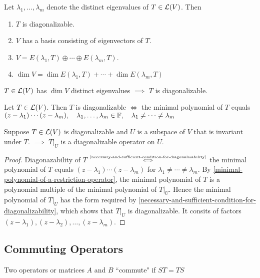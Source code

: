 \setcounter{thm}{45}
\begin{thm}
    \label{conditions-equivalent-to-diagonalizability}
    Let $\lambda_1, \dots,\lambda_m$ denote the distinct eigenvalues of $T\in \mathcal{L} (V)$. Then
    \begin{enumerate}[label=(\alph*)]
        \item $T$ is diagonalizable.
        \item $V$ has a basis consisting of eigenvectors of $T$.
        \item $V=E(\lambda_1, T) \oplus \cdots \oplus E(\lambda_m, T).$
        \item $\dim V = \dim E(\lambda_1, T) + \cdots + \dim E(\lambda_m, T)$
    \end{enumerate}
\end{thm}

\setcounter{thm}{57}
\begin{thm}
    \label{enough-eigenvalues-implies-diagonalizability}
    $T\in \mathcal{L}(V)$ has $\dim V$ distinct eigenvalues $\implies$ $T$ is diagonalizable. 
\end{thm}

\pagebreak

\setcounter{thm}{61}
\begin{thm}
    \label{necessary-and-sufficient-condition-for-diagonalizability}
    Let $T\in \mathcal{L} (V)$. Then $T$ is diagonalizable $\iff$ the minimal polynomial of $T$ equals $(z-\lambda_1) \cdots (z-\lambda_m), \quad \lambda_1, \dots, \lambda_m \in \mathbb{F}, \quad \lambda_1 \neq \cdots \neq \lambda_m$
\end{thm}

\setcounter{thm}{64}
\begin{thm}
    \label{restriction-ofdiagonalizable-operator-to-invariant-subspace}
    Suppose $T\in \mathcal{L}(V)$ is diagonalizable and $U$ is a subspace of $V$ that is invariant under $T$. $\implies$ $\left.T\right|_U$ is a diagonalizable operator on $U$. 
\end{thm}
\begin{proof}
    Diagonazability of $T$ $\mathsmaller{\overset{\text{\ref{necessary-and-sufficient-condition-for-diagonalizability}}}{\iff}}$ the minimal polynomial of $T$ equals $(z-\lambda_1)\cdots(z-\lambda_m)$ for $\lambda_1 \neq \cdots \neq \lambda_m$. By \ref{minimal-polynomial-of-a-restriction-operator}, the minimal polynomial of $T$ is a polynomial multiple of the minimal polynomial of $\left.T\right|_U$. Hence the minimal polynomial of $\left.T\right|_U$  has the form required by \ref{necessary-and-sufficient-condition-for-diagonalizability}, which shows that $\left.T\right|_U$ is diagonalizable. It consits of factors $(z-\lambda_1),(z-\lambda_2), \dots, (z-\lambda_m)$.
\end{proof}

\subsection{Commuting Operators}
\begin{mydef}
    Two operators or matrices $A$ and $B$ ``commute" if $ST=TS$
\end{mydef}